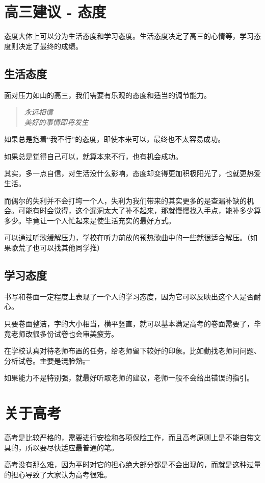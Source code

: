 \documentclass[UTF8,11pt,a4paper]{ctexart}
\begin{document}
	\section{高三建议 - 态度}%
		态度大体上可以分为生活态度和学习态度。生活态度决定了高三的心情等，学习态度则决定了最终的成绩。
		\subsection{生活态度}
			面对压力如山的高三，我们需要有乐观的态度和适当的调节能力。
			
			\begin{quote}
				\it 永远相信\\
				美好的事情即将发生\\
			\end{quote}
		
			如果总是抱着“我不行”的态度，即使本来可以，最终也不太容易成功。
			
			如果总是觉得自己可以，就算本来不行，也有机会成功。
			
			其实，多一点自信，对生活没什么影响，态度却变得更加积极阳光了，也就更热爱生活。
			
			而偶尔的失利并不会打垮一个人，失利为我们带来的其实更多的是查漏补缺的机会。可能有时会觉得，这个漏洞太大了补不起来，那就慢慢找入手点，能补多少算多少。毕竟让一个人忙起来是使生活充实的最好方式。
			
			可以通过听歌缓解压力，学校在听力前放的预热歌曲中的一些就很适合解压。（如果歌荒了也可以找其他同学推）
		\subsection{学习态度}
			书写和卷面一定程度上表现了一个人的学习态度，因为它可以反映出这个人是否耐心。
			
			只要卷面整洁，字的大小相当，横平竖直，就可以基本满足高考的卷面需要了，毕竟老师改很多份试卷也会审美疲劳。
			
			在学校认真对待老师布置的任务，给老师留下较好的印象。比如勤找老师问问题、分析试卷。\sout{主要是混脸熟。}
			
			如果能力不是特别强，就最好听取老师的建议，老师一般不会给出错误的指引。
	\section{关于高考}
		高考是比较严格的，需要进行安检和各项保险工作，而且高考原则上是不能自带文具的，所以要尽快适应最普通的笔。
		
		高考没有那么难，因为平时对它的担心绝大部分都是不会出现的，而就是这种过量的担心导致了大家认为高考很难。
		
\end{document}
